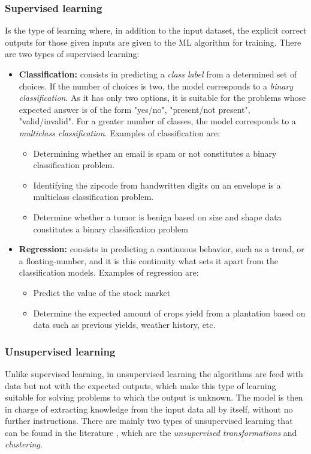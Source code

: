 \subsubsection{Supervised learning}
Is the type of learning where, in addition to the input dataset, the explicit correct outputs for those given inputs are given to the \ac{ML} algorithm for training. There are two types of supervised learning:
\begin{itemize}
    \item \textbf{Classification:} consists in predicting a \emph{class label} from a determined set of choices. If the number of choices is two, the model corresponds to a \emph{binary classification}. As it has only two options, it is suitable for the problems whose expected answer is of the form "yes/no", "present/not present", "valid/invalid". For a greater number of classes, the model corresponds to a \emph{multiclass classification}. Examples of classification are:
        \begin{itemize}
            \item Determining whether an email is spam or not constitutes a binary classification problem.
            \item Identifying the zipcode from handwritten digits on an envelope is a multiclass classification problem.
            \item Determine whether a tumor is benign based on size and shape data constitutes a binary classification problem
        \end{itemize}
    \item \textbf{Regression:} consists in predicting a continuous behavior, such as a trend, or a floating-number, and it is this continuity what sets it apart from the classification models. Examples of regression are:
        \begin{itemize}
            \item Predict the value of the stock market
            \item Determine the expected amount of crops yield from a plantation based on data such as previous yields, weather history, etc.
        \end{itemize}
\end{itemize}

\subsubsection{Unsupervised learning}
Unlike supervised learning, in unsupervised learning the algorithms are feed with data but not with the expected outputs, which make this type of learning suitable for solving problems to which the output is unknown. The model is then in charge of extracting knowledge from the input data all by itself, without no further instructions. There are mainly two types of unsupervised learning that can be found in the literature \cite{Andreas}, which are the \emph{unsupervised transformations} and \emph{clustering}.


